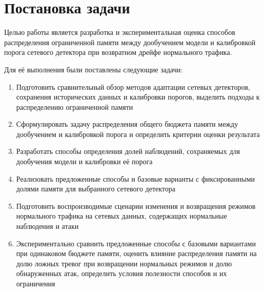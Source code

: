 \documentclass[12pt,a4paper]{article}
\def\taskdocumentend{\end{document}}
\begin{document}
\fi

\section{Постановка задачи}
\label{sec:task}

Целью работы является разработка и экспериментальная оценка
способов распределения ограниченной памяти между дообучением модели
и калибровкой порога сетевого детектора при возвратном дрейфе
нормального трафика.

Для её выполнения были поставлены следующие задачи:
\begin{enumerate}
    \item Подготовить сравнительный обзор методов адаптации сетевых
          детекторов, сохранения исторических данных и калибровки
          порогов, выделить подходы к распределению ограниченной памяти
    \item Сформулировать задачу распределения общего бюджета памяти
          между дообучением и калибровкой порога и определить критерии
          оценки результата
    \item Разработать способы определения долей наблюдений,
          сохраняемых для дообучения модели и калибровки её порога
    \item Реализовать предложенные способы и базовые варианты
          с фиксированными долями памяти для выбранного сетевого детектора
    \item Подготовить воспроизводимые сценарии изменения и возвращения
          режимов нормального трафика на сетевых данных, содержащих
          нормальные наблюдения и атаки
    \item Экспериментально сравнить предложенные способы с базовыми
          вариантами при одинаковом бюджете памяти, оценить влияние
          распределения памяти на долю ложных тревог при возвращении
          нормальных режимов и долю обнаруженных атак, определить
          условия полезности способов и их ограничения
\end{enumerate}

\taskdocumentend
\end{document}
